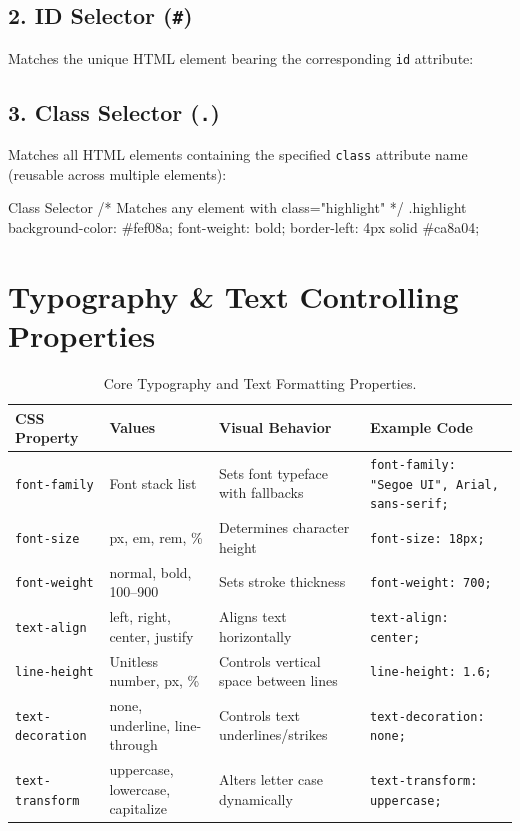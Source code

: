 \subsection{2. ID Selector (\texttt{\#})}
Matches the unique HTML element bearing the corresponding \texttt{id} attribute:

\subsection{3. Class Selector (\texttt{.})}
Matches all HTML elements containing the specified \texttt{class} attribute name (reusable across multiple elements):
\begin{csscode}{Class Selector}
/* Matches any element with class="highlight" */
.highlight {
    background-color: #fef08a;
    font-weight: bold;
    border-left: 4px solid #ca8a04;
}
\end{csscode}

\section{Typography \& Text Controlling Properties}

\begin{table}[htbp]
\centering
\small
\renewcommand{\arraystretch}{1.3}
\begin{tabularx}{\linewidth}{ll>{\raggedright\arraybackslash}Xl}
\toprule
\textbf{CSS Property} & \textbf{Values} & \textbf{Visual Behavior} & \textbf{Example Code} \\
\midrule
\texttt{font-family} & Font stack list & Sets font typeface with fallbacks & \texttt{font-family: "Segoe UI", Arial, sans-serif;} \\
\texttt{font-size} & px, em, rem, \% & Determines character height & \texttt{font-size: 18px;} \\
\texttt{font-weight} & normal, bold, 100--900 & Sets stroke thickness & \texttt{font-weight: 700;} \\
\texttt{text-align} & left, right, center, justify & Aligns text horizontally & \texttt{text-align: center;} \\
\texttt{line-height} & Unitless number, px, \% & Controls vertical space between lines & \texttt{line-height: 1.6;} \\
\texttt{text-decoration} & none, underline, line-through & Controls text underlines/strikes & \texttt{text-decoration: none;} \\
\texttt{text-transform} & uppercase, lowercase, capitalize & Alters letter case dynamically & \texttt{text-transform: uppercase;} \\
\bottomrule
\end{tabularx}
\caption{Core Typography and Text Formatting Properties.}
\label{tab:typography-props}
\end{table}

